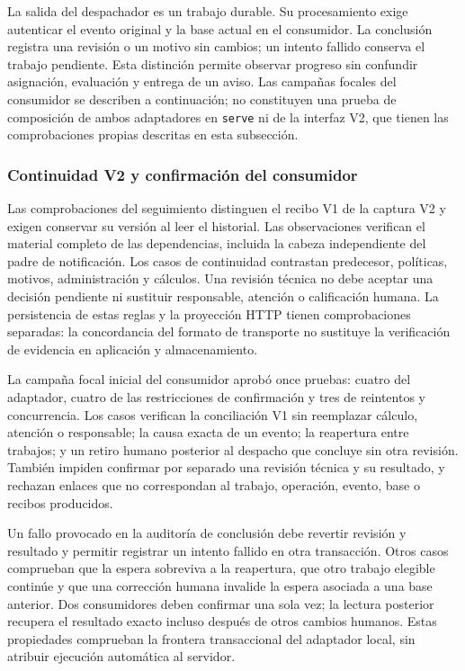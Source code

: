 La salida del despachador es un trabajo durable. Su procesamiento exige autenticar el evento original y la base actual en el consumidor. La conclusión registra una revisión o un motivo sin cambios; un intento fallido conserva el trabajo pendiente. Esta distinción permite observar progreso sin confundir asignación, evaluación y entrega de un aviso. Las campañas focales del consumidor se describen a continuación; no constituyen una prueba de composición de ambos adaptadores en \texttt{serve} ni de la interfaz V2, que tienen las comprobaciones propias descritas en esta subsección.

\subsubsection{Continuidad V2 y confirmación del consumidor}

Las comprobaciones del seguimiento distinguen el recibo V1 de la captura V2 y exigen conservar su versión al leer el historial. Las observaciones verifican el material completo de las dependencias, incluida la cabeza independiente del padre de notificación. Los casos de continuidad contrastan predecesor, políticas, motivos, administración y cálculos. Una revisión técnica no debe aceptar una decisión pendiente ni sustituir responsable, atención o calificación humana. La persistencia de estas reglas y la proyección HTTP tienen comprobaciones separadas: la concordancia del formato de transporte no sustituye la verificación de evidencia en aplicación y almacenamiento.

La campaña focal inicial del consumidor aprobó once pruebas: cuatro del adaptador, cuatro de las restricciones de confirmación y tres de reintentos y concurrencia. Los casos verifican la conciliación V1 sin reemplazar cálculo, atención o responsable; la causa exacta de un evento; la reapertura entre trabajos; y un retiro humano posterior al despacho que concluye sin otra revisión. También impiden confirmar por separado una revisión técnica y su resultado, y rechazan enlaces que no correspondan al trabajo, operación, evento, base o recibos producidos.

Un fallo provocado en la auditoría de conclusión debe revertir revisión y resultado y permitir registrar un intento fallido en otra transacción. Otros casos comprueban que la espera sobreviva a la reapertura, que otro trabajo elegible continúe y que una corrección humana invalide la espera asociada a una base anterior. Dos consumidores deben confirmar una sola vez; la lectura posterior recupera el resultado exacto incluso después de otros cambios humanos. Estas propiedades comprueban la frontera transaccional del adaptador local, sin atribuir ejecución automática al servidor.

